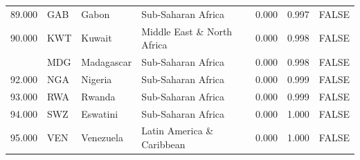\begin{table}
\begin{tabular}[t]{lllllll}
89.000 & GAB & Gabon & Sub-Saharan Africa & 0.000 & 0.997 & FALSE\\
90.000 & KWT & Kuwait & Middle East \& North Africa & 0.000 & 0.998 & FALSE\\
\addlinespace
91.000 & MDG & Madagascar & Sub-Saharan Africa & 0.000 & 0.998 & FALSE\\
92.000 & NGA & Nigeria & Sub-Saharan Africa & 0.000 & 0.999 & FALSE\\
93.000 & RWA & Rwanda & Sub-Saharan Africa & 0.000 & 0.999 & FALSE\\
94.000 & SWZ & Eswatini & Sub-Saharan Africa & 0.000 & 1.000 & FALSE\\
95.000 & VEN & Venezuela & Latin America \& Caribbean & 0.000 & 1.000 & FALSE\\
\bottomrule
\end{tabular}
\end{table}
